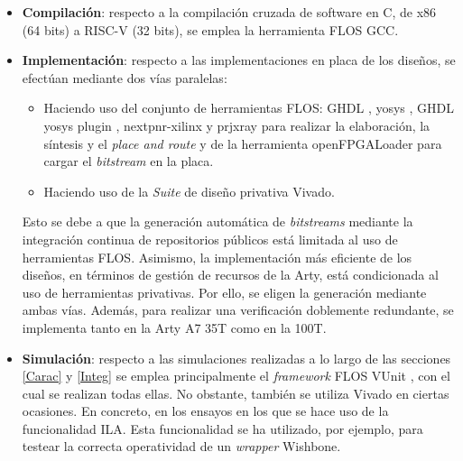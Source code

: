 \begin{itemize}
    \item \textbf{Compilación}: respecto a la compilación cruzada de software en C, de x86 (64 bits) a RISC-V (32 bits), se emplea la herramienta FLOS GCC.
    \item \textbf{Implementación}: respecto a las implementaciones en placa de los diseños, se efectúan mediante dos vías paralelas:
        \begin{itemize}
            \item Haciendo uso del conjunto de herramientas FLOS: GHDL \cite{gh:ghdl}, yosys \cite{gh:yosys}, GHDL yosys plugin \cite{gh:ghdl-plugin}, nextpnr-xilinx \cite{gh:nextpnr} y prjxray \cite{gh:prjxray} para realizar la elaboración, la síntesis y el \textit{place and route} y de la herramienta openFPGALoader \cite{gh:openFPGALoader} para cargar el \textit{bitstream} en la placa.
            \item Haciendo uso de la \textit{Suite} de diseño privativa Vivado.
        \end{itemize}
Esto se debe a que la generación automática de \textit{bitstreams} mediante la integración continua de repositorios públicos está limitada al uso de herramientas FLOS.
Asimismo, la implementación más eficiente de los diseños, en términos de gestión de recursos de la Arty, está condicionada al uso de herramientas privativas.
Por ello, se eligen la generación mediante ambas vías.
Además, para realizar una verificación doblemente redundante, se implementa tanto en la Arty A7 35T como en la 100T.
    \item \textbf{Simulación}: respecto a las simulaciones realizadas a lo largo de las secciones \ref{Carac} y \ref{Integ} se emplea principalmente el \textit{framework} FLOS VUnit \cite{gh:vunit}, con el cual se realizan todas ellas.
No obstante, también se utiliza Vivado en ciertas ocasiones.  
En concreto, en los ensayos en los que se hace uso de la funcionalidad ILA.
Esta funcionalidad se ha utilizado, por ejemplo, para testear la correcta operatividad de un \textit{wrapper} Wishbone.
\end{itemize} 

